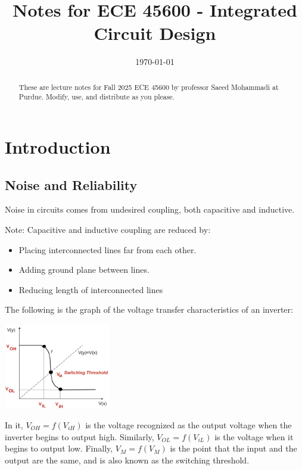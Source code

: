 \documentclass[nobib,fleqn,8pt]{article}
\title{Notes for ECE 45600 - Integrated Circuit Design}
\date{\today}  %
\begin{document}
\maketitle

\begin{abstract}
    These are lecture notes for Fall 2025 ECE 45600 by professor Saeed Mohammadi at Purdue. Modify, use, and distribute as you please.
\end{abstract}

\tableofcontents

\newpage
\section{Introduction}
\subsection{Noise and Reliability}
Noise in circuits comes from undesired coupling, both capacitive and
inductive.\\
\begin{mdframed}
    Note: Capacitive and inductive coupling are reduced by:
    \begin{itemize}
        \item Placing interconnected lines far from each other.
        \item Adding ground plane between lines.
        \item Reducing length of interconnected lines
    \end{itemize}
\end{mdframed}
The following is the graph of the voltage transfer characteristics of an inverter:
\begin{center}
    \includegraphics[width = 175px]{images/voltage_transfer_characteristics.png}
\end{center}
In it, $V_{OH} = f(V_{iH})$ is the voltage recognized as the output voltage when the inverter begins to output high. Similarly, $V_{OL} = f(V_{iL})$ is the voltage when it begins to output low. Finally, $V_M = f(V_M)$ is the point that the input and the output are the same, and is also known as the switching threshold.\\
\end{document}
